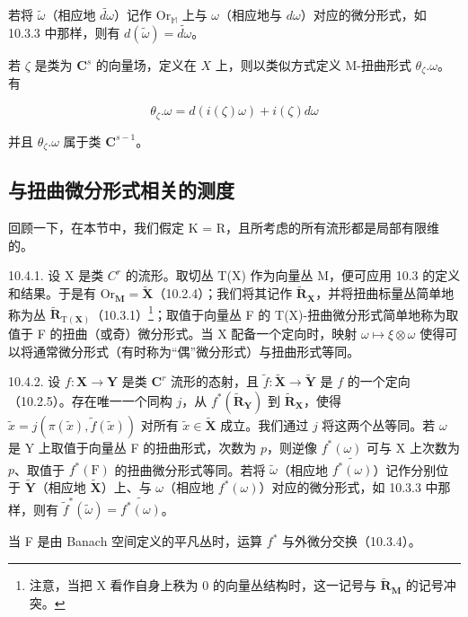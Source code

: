 若将 \(\tilde{\omega}\)（相应地 \(\widetilde{d\omega}\)）记作 \(\mathrm{Or}_{\mathbb{M}}\) 上与 \(\omega\)（相应地与 \(d\omega\)）对应的微分形式，如 10.3.3 中那样，则有 \(d(\tilde{\omega}) = \widetilde{d\omega}\)。

若 \(\zeta\) 是类为 \(\mathbf{C}^s\) 的向量场，定义在 \(X\) 上，则以类似方式定义 M-扭曲形式 \(\theta_{\zeta}.\omega\)。有

\[
\theta_ {\zeta}. \omega = d (i (\zeta) \omega) + i (\zeta) d \omega
\]

并且 \(\theta_{\zeta}.\omega\) 属于类 \(\mathbf{C}^{s - 1}\)。

\subsection{与扭曲微分形式相关的测度}

回顾一下，在本节中，我们假定 K = R，且所考虑的所有流形都是局部有限维的。

10.4.1. 设 X 是类 \(C^{r}\) 的流形。取切丛 T(X) 作为向量丛 M，便可应用 10.3 的定义和结果。于是有 \(\mathrm{Or}_{\mathbf{M}} = \tilde{\mathbf{X}}\)（10.2.4）；我们将其记作 \(\tilde{\mathbf{R}}_{\mathbf{X}}\)，并将扭曲标量丛简单地称为丛 \(\tilde{\mathbf{R}}_{\mathrm{T}(\mathbf{X})}\)（10.3.1）\footnote{注意，当把 X 看作自身上秩为 0 的向量丛结构时，这一记号与 \(\widetilde{\mathbf{R}}_{\mathbf{M}}\) 的记号冲突。}；取值于向量丛 F 的 T(X)-扭曲微分形式简单地称为取值于 F 的扭曲（或奇）微分形式。当 X 配备一个定向时，映射 \(\omega \mapsto \xi \otimes \omega\) 使得可以将通常微分形式（有时称为“偶”微分形式）与扭曲形式等同。

10.4.2. 设 \(f\colon\mathbf{X}\to\mathbf{Y}\) 是类 \(\mathbf{C}^{r}\) 流形的态射，且 \(\tilde{f}\colon\tilde{\mathbf{X}}\to\tilde{\mathbf{Y}}\) 是 \(f\) 的一个定向（10.2.5）。存在唯一一个同构 \(j\)，从 \(f^{*}(\widetilde{\mathbf{R}}_{\mathbf{Y}})\) 到 \(\widetilde{\mathbf{R}}_{\mathbf{X}}\)，使得 \(\tilde{x}=j(\pi(\tilde{x}),\tilde{f}(\tilde{x}))\) 对所有 \(\tilde{x}\in\tilde{\mathbf{X}}\) 成立。我们通过 \(j\) 将这两个丛等同。若 \(\omega\) 是 Y 上取值于向量丛 F 的扭曲形式，次数为 \(p\)，则逆像 \(f^{*}(\omega)\) 可与 X 上次数为 \(p\)、取值于 \(f^{*}(\mathrm{F})\) 的扭曲微分形式等同。若将 \(\tilde{\omega}\)（相应地 \(\widetilde{f^{*}(\omega)}\)）记作分别位于 \(\tilde{\mathbf{Y}}\)（相应地 \(\tilde{\mathbf{X}}\)）上、与 \(\omega\)（相应地 \(f^{*}(\omega)\)）对应的微分形式，如 10.3.3 中那样，则有 \(\tilde{f}^{*}(\tilde{\omega})=\widetilde{f^{*}(\omega)}\)。

当 F 是由 Banach 空间定义的平凡丛时，运算 \(f^*\) 与外微分交换（10.3.4）。

